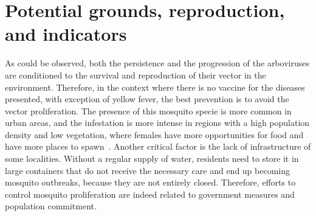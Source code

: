 \section{Potential grounds, reproduction, and indicators}
As could be observed, both the persistence and the progression of the arboviruses are conditioned to the survival and reproduction of their vector in the environment.
Therefore, in the context where there is no vaccine for the diseases presented, with exception of yellow fever, the best prevention is to avoid the vector proliferation.
The presence of this mosquito specie is more common in urban areas, and the infestation is more intense in regions with a high population density and low vegetation, where females have more opportunities for food and have more places to spawn~\cite{lambrechts2012vector}.
Another critical factor is the lack of infrastructure of some localities.
Without a regular supply of water, residents need to store it in large containers that do not receive the necessary care and end up becoming mosquito outbreaks, because they are not entirely closed.
Therefore, efforts to control mosquito proliferation are indeed related to government measures and population commitment.

